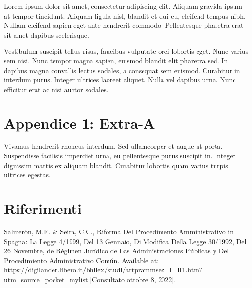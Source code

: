 \documentclass[12pt,it,a4paper,]{report}
\newlength{\cslhangindent}
\newenvironment{CSLReferences}[2] %
 {%
  \setlength{\parindent}{0pt}
  \ifodd #1 \everypar{\setlength{\hangindent}{\cslhangindent}}\ignorespaces\fi
  \ifnum #2 > 0
  \setlength{\parskip}{#2\baselineskip}
  \fi
 }%
 {}
\begin{document}
Lorem ipsum dolor sit amet, consectetur adipiscing elit. Aliquam gravida
ipsum at tempor tincidunt. Aliquam ligula nisl, blandit et dui eu,
eleifend tempus nibh. Nullam eleifend sapien eget ante hendrerit
commodo. Pellentesque pharetra erat sit amet dapibus scelerisque.

Vestibulum suscipit tellus risus, faucibus vulputate orci lobortis eget.
Nunc varius sem nisi. Nunc tempor magna sapien, euismod blandit elit
pharetra sed. In dapibus magna convallis lectus sodales, a consequat sem
euismod. Curabitur in interdum purus. Integer ultrices laoreet aliquet.
Nulla vel dapibus urna. Nunc efficitur erat ac nisi auctor sodales.

\hypertarget{appendice-1-extra-a}{%
\chapter*{Appendice 1: Extra-A}\label{appendice-1-extra-a}}

Vivamus hendrerit rhoncus interdum. Sed ullamcorper et augue at porta.
Suspendisse facilisis imperdiet urna, eu pellentesque purus suscipit in.
Integer dignissim mattis ex aliquam blandit. Curabitur lobortis quam
varius turpis ultrices egestas.

\footnotesize
\singlespacing
\setlength{\parindent}{0in}

\hypertarget{riferimenti}{%
\chapter*{Riferimenti}\label{riferimenti}}

\hypertarget{refs}{}
\begin{CSLReferences}{1}{0}
\leavevmode{}%
Salmerón, M.F. \& Seira, C.C., Riforma Del Procedimento Amministrativo
in {Spagna}: La {Legge} 4/1999, Del 13 Gennaio, Di Modifica Della
{Legge} 30/1992, Del 26 Novembre, de {Régimen Jurídico} de Las
{Administraciones Públicas} y Del {Procedimiento Administrativo Común}.
Available at:
\url{https://digilander.libero.it/bhilex/studi/artprammsez_I_II1.htm?utm_source=pocket_mylist}
{[}Consultato ottobre 8, 2022{]}.

\end{CSLReferences}
\end{document}

